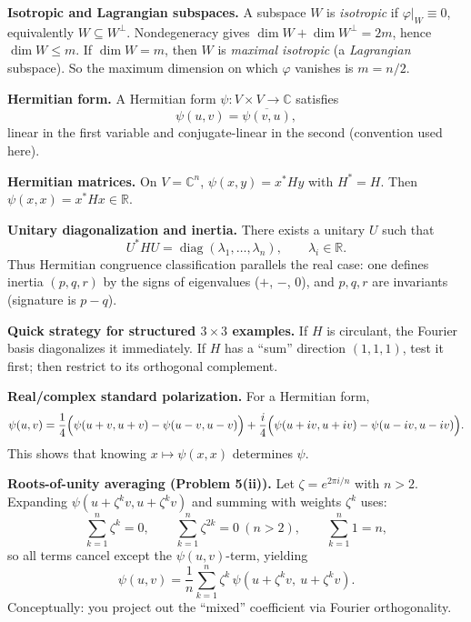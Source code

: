 \begin{problem}[CP-I-0055]
\textbf{Isotropic and Lagrangian subspaces.}
A subspace $W$ is \emph{isotropic} if $\varphi|_W\equiv 0$, equivalently $W\subseteq W^\perp$.
Nondegeneracy gives $\dim W+\dim W^\perp=2m$, hence $\dim W\le m$.
If $\dim W=m$, then $W$ is \emph{maximal isotropic} (a \emph{Lagrangian} subspace).
So the maximum dimension on which $\varphi$ vanishes is $m=n/2$.

\textbf{Hermitian form.}
A Hermitian form $\psi:V\times V\to\mathbb C$ satisfies
\[
\psi(u,v)=\overline{\psi(v,u)},
\]
linear in the first variable and conjugate-linear in the second (convention used here).

\textbf{Hermitian matrices.}
On $V=\mathbb C^n$, $\psi(x,y)=x^*Hy$ with $H^*=H$.
Then $\psi(x,x)=x^*Hx\in \mathbb R$.

\textbf{Unitary diagonalization and inertia.}
There exists a unitary $U$ such that
\[
U^*HU=\operatorname{diag}(\lambda_1,\dots,\lambda_n),\qquad \lambda_i\in\mathbb R.
\]
Thus Hermitian congruence classification parallels the real case:
one defines inertia $(p,q,r)$ by the signs of eigenvalues ($+$, $-$, $0$),
and $p,q,r$ are invariants (signature is $p-q$).

\textbf{Quick strategy for structured $3\times 3$ examples.}
If $H$ is circulant, the Fourier basis diagonalizes it immediately.
If $H$ has a ``sum'' direction $(1,1,1)$, test it first; then restrict to its orthogonal complement.

\textbf{Real/complex standard polarization.}
For a Hermitian form,
\[
\psi(u,v)=\frac14\Bigl(\psi(u+v,u+v)-\psi(u-v,u-v)\Bigr)
+\frac{i}{4}\Bigl(\psi(u+iv,u+iv)-\psi(u-iv,u-iv)\Bigr).
\]
This shows that knowing $x\mapsto \psi(x,x)$ determines $\psi$.

\textbf{Roots-of-unity averaging (Problem 5(ii)).}
Let $\zeta=e^{2\pi i/n}$ with $n>2$.
Expanding $\psi(u+\zeta^k v,u+\zeta^k v)$ and summing with weights $\zeta^k$ uses:
\[
\sum_{k=1}^n \zeta^k=0,\qquad \sum_{k=1}^n \zeta^{2k}=0\ (n>2),\qquad \sum_{k=1}^n 1=n,
\]
so all terms cancel except the $\psi(u,v)$-term, yielding
\[
\psi(u,v)=\frac1n\sum_{k=1}^n \zeta^k\,\psi(u+\zeta^k v,\ u+\zeta^k v).
\]
Conceptually: you project out the ``mixed'' coefficient via Fourier orthogonality.\end{problem}

